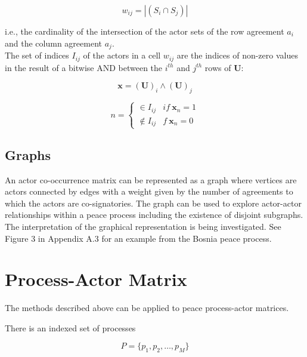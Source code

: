 \documentclass{article}
\begin{document}
\begin{equation}
w_{ij} =  |(S_{i} \cap S_{j}) | 
\end{equation}

i.e., the cardinality of the intersection of the actor sets of the row agreement $a_i$ and the column agreement $a_j$. \\

The set of indices $I_{ij}$ of the actors in a cell $w_{ij}$ are the indices of non-zero values in the result of a bitwise AND between the $i^{th}$ and $j^{th}$ rows of $\bm{U}$:

\begin{equation}
\bm{x} = \bm{(U)}_i \land \bm{(U)} _j
\end{equation}

\begin{equation}
n =
\begin{cases}
\in I_{ij} & if \  \bm{x}_n = 1\\
\notin I_{ij} & f \  \bm{x}_n = 0
\end{cases}
\end{equation}

\subsection{Graphs}

An actor co-occurrence matrix can be represented as a graph where vertices are actors connected by edges with a weight given by the number of agreements to which the actors are co-signatories.  The graph can be used to explore actor-actor relationships within a peace process including the existence of disjoint subgraphs. The interpretation of the graphical representation is being investigated. See Figure 3 in Appendix A.3 for an example from the Bosnia peace process. \newline


\section{Process-Actor Matrix}

The methods described above can be applied to peace process-actor matrices.\newline

There is an indexed set of processes 

\begin{equation}
P=\{p_1,p_2,…,p_M\}
\end{equation}
\end{document}
